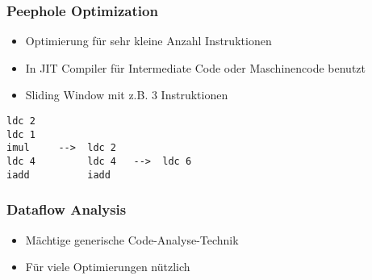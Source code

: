 \subsubsection{Peephole Optimization}
\begin{itemize}[topsep=0pt]
    \itemsep -0.2em
    \item Optimierung für sehr kleine Anzahl Instruktionen
    \item In JIT Compiler für Intermediate Code oder Maschinencode benutzt
    \item Sliding Window mit z.B. 3 Instruktionen
\end{itemize}

\begin{lstlisting}
ldc 2
ldc 1
imul     -->  ldc 2
ldc 4         ldc 4   -->  ldc 6
iadd          iadd
\end{lstlisting}

\subsubsection{Dataflow Analysis}
\begin{itemize}[topsep=0pt]
    \itemsep -0.2em
    \item Mächtige generische Code-Analyse-Technik
    \item Für viele Optimierungen nützlich
\end{itemize}